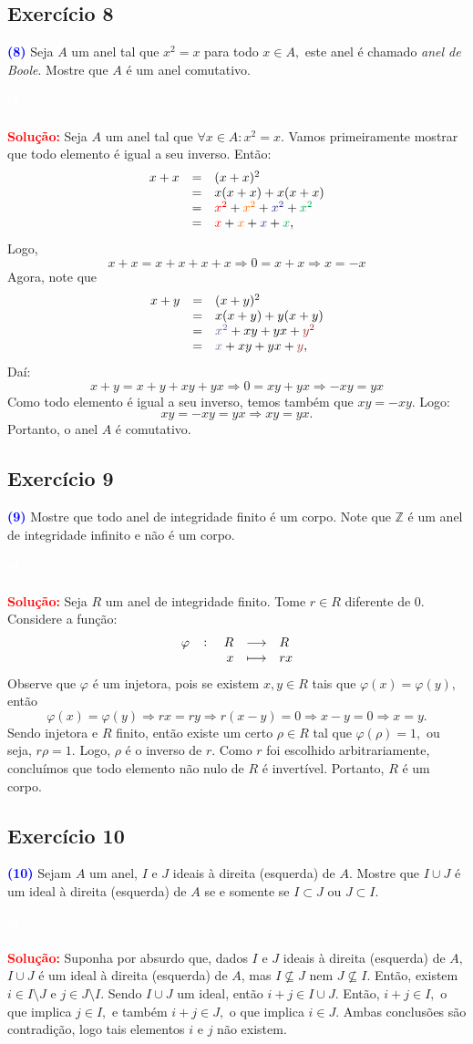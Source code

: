 \documentclass[11pt,a4paper]{article}
\newcommand{\exercicio}[1]{\subsection{Exercício #1} \textcolor{blue}{\bf(#1)}}
\newcommand{\solucao}[1]{
\textbf{\textcolor{white}{oi}\\ \\ \textcolor{red}{Solução:}} #1}
\begin{document}
\exercicio{8} Seja $A$ um anel tal que $x^2 = x$ para todo $x \in A,$ este anel é chamado \emph{anel de Boole}. Mostre que $A$ é um anel comutativo.
\solucao{
Seja $A$ um anel tal que $\forall x\in A:x^2=x$. Vamos primeiramente mostrar que todo elemento é igual a seu inverso. Então:
\[
\begin{array}{rcl}
x+x&=&(x+x)^2\\&=&x(x+x)+x(x+x)\\&=&\textcolor{red}{x^2}+\textcolor{Laranja}{x^2}+\textcolor{Blue}{x^2}+\textcolor{Green}{x^2}\\&=&\textcolor{red}{x}+\textcolor{Laranja}{x}+\textcolor{Blue}{x}+\textcolor{Green}{x},
\end{array}
\]
Logo,
\[
x + x = x + x +x +x \Rightarrow 0=x+x \Rightarrow x = -x
\]
Agora, note que
\[
\begin{array}{rcl}
x+y&=&(x+y)^2\\&=&x(x+y)+y(x+y)\\&=&\textcolor{CadetBlue}{x^2}+xy+yx+\textcolor{Mahogany}{y^2}\\&=&\textcolor{CadetBlue}{x}+xy+yx+\textcolor{Mahogany}{y},
\end{array}
\]
Daí:
\[
x + y = x + y + xy + yx \Rightarrow 0=xy+yx \Rightarrow -xy = yx
\]
Como todo elemento é igual a seu inverso, temos também que $xy = -xy.$ Logo:
\[
xy = -xy = yx \Rightarrow xy = yx.
\]
Portanto, o anel $A$ é comutativo.
}

\exercicio{9} Mostre que todo anel de integridade finito é um corpo. Note que $\mathbb{Z}$ é um anel de integridade infinito e não é um corpo.
\solucao{
Seja $R$ um anel de integridade finito. Tome $r \in R$ diferente de $0.$ Considere a função:
\[
\fullfunction{\varphi}{R}{R}{x}{rx}
\]
Observe que $\varphi$ é um injetora, pois se existem $x,y \in R$ tais que $\varphi(x) = \varphi(y),$ então
\[
\varphi(x) = \varphi(y) \Rightarrow rx = ry \Rightarrow r(x - y) = 0 \Rightarrow x - y = 0 \Rightarrow x = y.
\]
Sendo injetora e $R$ finito, então existe um certo $\rho \in R$ tal que $\varphi(\rho) = 1,$ ou seja, $r\rho = 1.$ Logo, $\rho$ é o inverso de $r.$ Como $r$ foi escolhido arbitrariamente, concluímos que todo elemento não nulo de $R$ é invertível. Portanto, $R$ é um corpo.
}
\exercicio{10} Sejam $A$ um anel, $I$ e $J$ ideais à direita (esquerda) de $A.$ Mostre que $I \cup J$ é um ideal à direita
(esquerda) de $A$ se e somente se $I \subset J$ ou $J \subset I.$
\solucao{Suponha por absurdo que, dados $I$ e $J$ ideais à direita (esquerda) de $A,$ $I \cup J$ é um ideal à direita (esquerda) de $A$, mas $I \nsubseteq J$ nem $J \nsubseteq I.$ Então, existem $i \in I \setminus J$ e $j \in J \setminus I.$ Sendo $I \cup J$ um ideal, então $i+j \in I \cup J.$ Então, $i+j \in I,$ o que implica $j \in I,$ e também $i+j \in J,$ o que implica $i \in J.$ Ambas conclusões são contradição, logo tais elementos $i$ e $j$ não existem.
}
\end{document}
